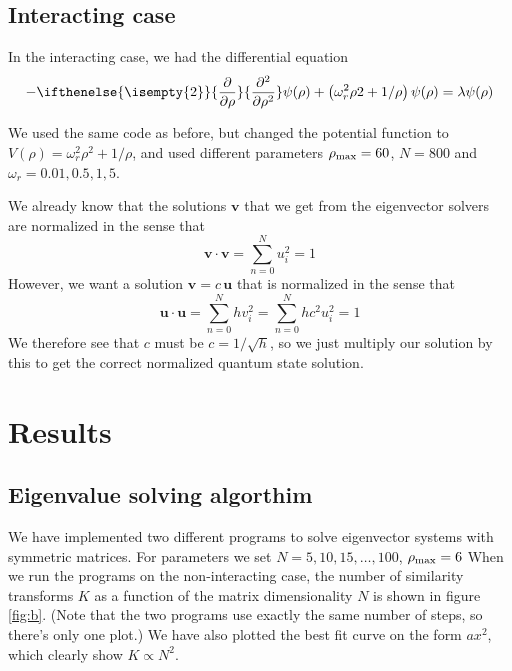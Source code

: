 \documentclass[11pt,a4paper]{article}
\newcommand\V[1]{\mathbf{#1}}                  %
\newcommand\pdf[3][]{{%
  \ifthenelse{\isempty{#1}}%
    {\frac{\partial{#2}}{\partial{#3}}}%
    {\frac{\partial^{#1}{#2}}{{\partial{#3}^{#1}}}}%
}}
\begin{document}
\subsection{Interacting case}
\label{sec:d-method}

In the interacting case, we had the differential equation
\begin{equation}
  \label{eq:diff-interact}
  - \pdf[2]{}{\rho} \psi(\rho) + \left( \omega_r^2 \rho 2 + 1 / \rho \right) \psi(\rho) = \lambda \psi(\rho)
\end{equation}

We used the same code as before, but changed the potential function to $V(\rho) = \omega_r^2 \rho^2 + 1/\rho$, and used different parameters $\rho_{\rm max} = 60$, $N = 800$ and $\omega_r = 0.01, 0.5, 1, 5$.

We already know that the solutions $\V{v}$ that we get from the eigenvector solvers are normalized in the sense that
\begin{equation}
  \V{v} \cdot \V{v} = \sum_{n=0}^N u_i^2 = 1
\end{equation}
However, we want a solution $\V{v} = c \, \V{u}$ that is normalized in the sense that
\begin{equation}
  \V{u} \cdot \V{u} = \sum_{n=0}^N h v_i^2 = \sum_{n=0}^N h c^2 u_i^2 = 1
\end{equation}
We therefore see that $c$ must be $c = 1 / \sqrt{h}$, so we just multiply our solution by this to get the correct normalized quantum state solution.

\section{Results}

\subsection{Eigenvalue solving algorthim}

We have implemented two different programs to solve eigenvector systems with symmetric matrices. For parameters we set $N = 5,10,15,\ldots,100$, $\rho_{\rm max} = 6$ When we run the programs on the non-interacting case, the number of similarity transforms $K$ as a function of the matrix dimensionality $N$ is shown in figure \ref{fig:b}. (Note that the two programs use exactly the same number of steps, so there's only one plot.) We have also plotted the best fit curve on the form $a x^2$, which clearly show $K \propto N^2$.
\end{document}
